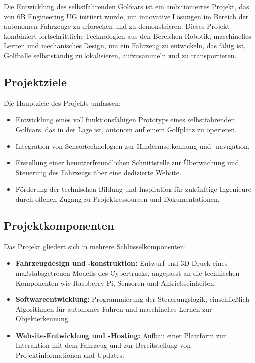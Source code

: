 Die Entwicklung des selbstfahrenden Golfcars ist ein ambitioniertes Projekt, das von 6B Engineering UG initiiert wurde, um innovative Lösungen im Bereich der autonomen Fahrzeuge zu erforschen und zu demonstrieren. Dieses Projekt kombiniert fortschrittliche Technologien aus den Bereichen Robotik, maschinelles Lernen und mechanisches Design, um ein Fahrzeug zu entwickeln, das fähig ist, Golfbälle selbstständig zu lokalisieren, aufzusammeln und zu transportieren.

\subsection{Projektziele}
Die Hauptziele des Projekts umfassen:
\begin{itemize}
  \item Entwicklung eines voll funktionsfähigen Prototyps eines selbstfahrenden Golfcars, das in der Lage ist, autonom auf einem Golfplatz zu operieren.
  \item Integration von Sensortechnologien zur Hinderniserkennung und -navigation.
  \item Erstellung einer benutzerfreundlichen Schnittstelle zur Überwachung und Steuerung des Fahrzeugs über eine dedizierte Website.
  \item Förderung der technischen Bildung und Inspiration für zukünftige Ingenieure durch offenen Zugang zu Projektressourcen und Dokumentationen.
\end{itemize}

\newpage

\subsection{Projektkomponenten}
Das Projekt gliedert sich in mehrere Schlüsselkomponenten:
\begin{itemize}
  \item \textbf{Fahrzeugdesign und -konstruktion:} Entwurf und 3D-Druck eines maßstabsgetreuen Modells des Cybertrucks, angepasst an die technischen Komponenten wie Raspberry Pi, Sensoren und Antriebseinheiten.
  \item \textbf{Softwareentwicklung:} Programmierung der Steuerungslogik, einschließlich Algorithmen für autonomes Fahren und maschinelles Lernen zur Objekterkennung.
  \item \textbf{Website-Entwicklung und -Hosting:} Aufbau einer Plattform zur Interaktion mit dem Fahrzeug und zur Bereitstellung von Projektinformationen und Updates.
\end{itemize}

